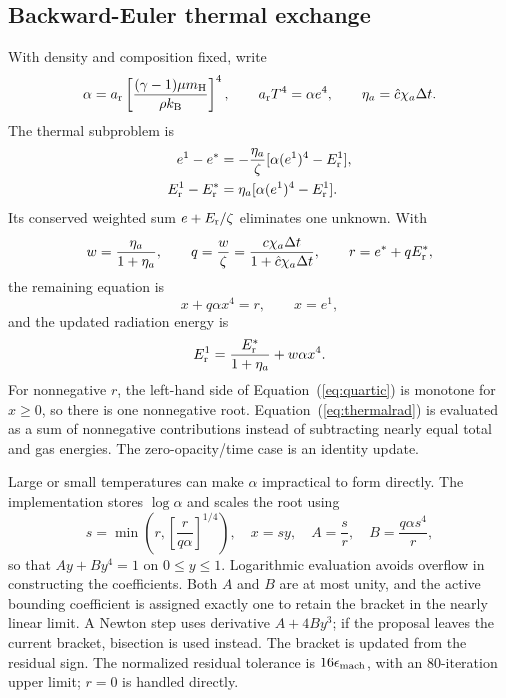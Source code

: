 \documentclass[manuscript]{aastex7}
\newcommand{\Er}{E_{\rm r}}
\newcommand{\ar}{a_{\rm r}}
\newcommand{\dt}{\Delta t}
\newcommand{\eps}{\epsilon_{\rm mach}}
\newcommand{\chat}{\hat{c}}
\begin{document}
\subsection{Backward-Euler thermal exchange}
With density and composition fixed, write
\begin{equation}
 \alpha=\ar\left[\frac{(\gamma-1)\mu m_{\rm H}}
                         {\rho k_{\rm B}}\right]^4,
 \qquad \ar T^4=\alpha e^4,
 \qquad \eta_a=\chat\chi_a\dt.
\end{equation}
The thermal subproblem is
\begin{align}
 e^1-e^*&=-\frac{\eta_a}{\zeta}[\alpha(e^1)^4-\Er^1],\\
 \Er^1-\Er^*&=\eta_a[\alpha(e^1)^4-\Er^1].
 \label{eq:BE}
\end{align}
Its conserved weighted sum $e+\Er/\zeta$ eliminates one unknown. With
\begin{equation}
 w=\frac{\eta_a}{1+\eta_a},\qquad
 q=\frac{w}{\zeta}=\frac{c\chi_a\dt}{1+\chat\chi_a\dt},\qquad
 r=e^*+q\Er^*,
\end{equation}
the remaining equation is
\begin{equation}
 x+q\alpha x^4=r,\qquad x=e^1,
 \label{eq:quartic}
\end{equation}
and the updated radiation energy is
\begin{equation}
 \Er^1=\frac{\Er^*}{1+\eta_a}+w\alpha x^4.
 \label{eq:thermalrad}
\end{equation}
For nonnegative $r$, the left-hand side of
Equation~(\ref{eq:quartic}) is monotone for $x\geq0$, so there is one
nonnegative root. Equation~(\ref{eq:thermalrad}) is evaluated as a sum
of nonnegative contributions instead of subtracting nearly equal total
and gas energies. The zero-opacity/time case is an identity update.

Large or small temperatures can make $\alpha$ impractical to form
directly. The implementation stores $\log\alpha$ and scales the root
using
\begin{equation}
 s=\min\left(r,\left[\frac{r}{q\alpha}\right]^{1/4}\right),
 \quad x=sy,\quad
 A=\frac{s}{r},\quad B=\frac{q\alpha s^4}{r},
 \label{eq:scale}
\end{equation}
so that $Ay+By^4=1$ on $0\leq y\leq1$.
Logarithmic evaluation avoids overflow in constructing the coefficients.
Both $A$ and $B$ are at most unity, and the active bounding coefficient
is assigned exactly one to retain the bracket in the nearly linear
limit. A Newton step uses derivative $A+4By^3$; if the proposal leaves
the current bracket, bisection is used instead. The bracket is updated
from the residual sign. The normalized residual tolerance is $16\eps$,
with an 80-iteration upper limit; $r=0$ is handled directly.
\end{document}
